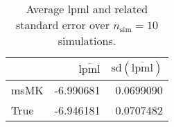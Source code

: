 \begin{table}[H]

\caption{Average lpml and related standard error over $n_{\text{sim}} = 10$ simulations.}
\centering
\begin{tabular}[t]{lrr}
\toprule
  & $\overbar{\text{lpml}}$ & $\text{sd}(\overbar{\text{lpml}})$\\
\midrule
msMK & -6.990681 & 0.0699090\\
True & -6.946181 & 0.0707482\\
\bottomrule
\end{tabular}
\end{table}